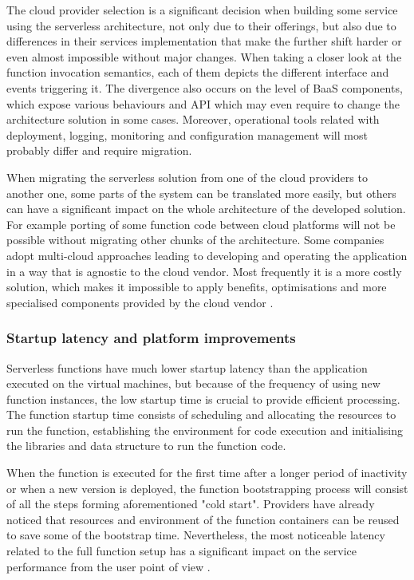 The cloud provider selection is a significant decision when building some service using the serverless architecture, not only due to their offerings, but also due to differences in their services implementation that make the further shift harder or even almost impossible without major changes. When taking a closer look at the function invocation semantics, each of them depicts the different interface and events triggering it. The divergence also occurs on the level of BaaS components, which expose various behaviours and API which may even require to change the architecture solution in some cases. Moreover, operational tools related with deployment, logging, monitoring and configuration management will most probably differ and require migration.

When migrating the serverless solution from one of the cloud providers to another one, some parts of the system can be translated more easily, but others can have a significant impact on the whole architecture of the developed solution. For example porting of some function code between cloud platforms will not be possible without migrating other chunks of the architecture. Some companies adopt multi-cloud approaches leading to developing and operating the application in a way that is agnostic to the cloud vendor. Most frequently it is a more costly solution, which makes it impossible to apply benefits, optimisations and more specialised components provided by the cloud vendor \cite{MartinFowlerServerless}.

\subsubsection*{Startup latency and platform improvements}

Serverless functions have much lower startup latency than the application executed on the virtual machines, but because of the frequency of using new function instances, the low startup time is crucial to provide efficient processing. The function startup time consists of scheduling and allocating the resources to run the function, establishing the environment for code execution and initialising the libraries and data structure to run the function code.

When the function is executed for the first time after a longer period of inactivity or when a new version is deployed, the function bootstrapping process will consist of all the steps forming aforementioned "cold start". Providers have already noticed that resources and environment of the function containers can be reused to save some of the bootstrap time. Nevertheless, the most noticeable latency related to the full function setup has a significant impact on the service performance from the user point of view \cite{BerkeleyServerless}.

